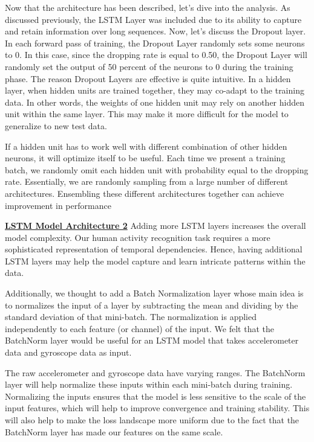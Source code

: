 \documentclass[conference]{IEEEtran}
\begin{document}
Now that the architecture has been described, let's dive into the analysis. As discussed previously, the LSTM Layer was included due to its ability to capture and retain information over long sequences. Now, let's discuss the Dropout layer. In each forward pass of training, the Dropout Layer randomly sets some neurons to 0. In this case, since the dropping rate is equal to 0.50, the Dropout Layer will randomly set the output of 50 percent of the neurons to 0 during the training phase. The reason Dropout Layers are effective is quite intuitive. In a hidden layer, when hidden units are trained together, they may co-adapt to the training data. In other words, the weights of one hidden unit may rely on another hidden unit within the same layer. This may make it more difficult for the model to generalize to new test data. \newline 

If a hidden unit has to work well with different combination of other hidden neurons, it will optimize itself to be useful. Each time we present a training batch, we randomly omit each hidden unit with probability equal to the dropping rate. Essentially, we are randomly sampling from a large number of different architectures. Ensembling these different architectures together can achieve improvement in performance \newline 

 
\textbf{\underline{LSTM Model Architecture 2}} \newline 
Adding more LSTM layers increases the overall model complexity. Our human activity recognition task requires a more sophisticated representation of temporal dependencies. Hence, having additional LSTM layers may help the model capture and learn intricate patterns within the data. \newline 

Additionally, we thought to add a Batch Normalization layer whose main idea is to normalizes the input of a layer by subtracting the mean and dividing by the standard deviation of that mini-batch. The normalization is applied independently to each feature (or channel) of the input. We felt that the BatchNorm layer would be useful for an LSTM model that takes accelerometer data and gyroscope data as input. \newline 

The raw accelerometer and gyroscope data have varying ranges. The BatchNorm layer will help normalize these inputs within each mini-batch during training. Normalizing the inputs ensures that the model is less sensitive to the scale of the input features, which will help to improve convergence and training stability. This will also help to make the loss landscape more uniform due to the fact that the BatchNorm layer has made our features on the same scale. \newline 
\end{document}
